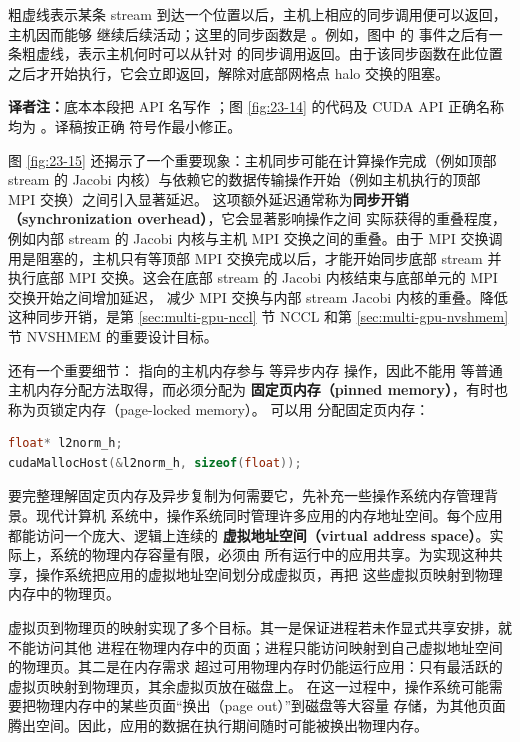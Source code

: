 粗虚线表示某条 stream 到达一个位置以后，主机上相应的同步调用便可以返回，主机因而能够
继续后续活动；这里的同步函数是 。例如，图中
 的
 事件之后有一条粗虚线，表示主机何时可以从针对 
的同步调用返回。由于该同步函数在此位置之后才开始执行，它会立即返回，解除对底部网格点
halo 交换的阻塞。

\noindent\textbf{译者注：}底本本段把 API 名写作 ；图
\ref{fig:23-14} 的代码及 CUDA API 正确名称均为 。译稿按正确
符号作最小修正。

图 \ref{fig:23-15} 还揭示了一个重要现象：主机同步可能在计算操作完成（例如顶部 stream 的
Jacobi 内核）与依赖它的数据传输操作开始（例如主机执行的顶部 MPI 交换）之间引入显著延迟。
这项额外延迟通常称为\textbf{同步开销（synchronization overhead）}，它会显著影响操作之间
实际获得的重叠程度，例如内部 stream 的 Jacobi 内核与主机 MPI 交换之间的重叠。由于 MPI
交换调用是阻塞的，主机只有等顶部 MPI 交换完成以后，才能开始同步底部 stream 并执行底部
MPI 交换。这会在底部 stream 的 Jacobi 内核结束与底部单元的 MPI 交换开始之间增加延迟，
减少 MPI 交换与内部 stream Jacobi 内核的重叠。降低这种同步开销，是第
\ref{sec:multi-gpu-nccl} 节 NCCL 和第 \ref{sec:multi-gpu-nvshmem} 节 NVSHMEM 的重要设计目标。

还有一个重要细节： 指向的主机内存参与  等异步内存
操作，因此不能用  等普通主机内存分配方法取得，而必须分配为
\textbf{固定页内存（pinned memory）}，有时也称为页锁定内存（page-locked memory）。
可以用  分配固定页内存：

\begin{lstlisting}[language=C++,numbers=none]
float* l2norm_h;
cudaMallocHost(&l2norm_h, sizeof(float));
\end{lstlisting}

要完整理解固定页内存及异步复制为何需要它，先补充一些操作系统内存管理背景。现代计算机
系统中，操作系统同时管理许多应用的内存地址空间。每个应用都能访问一个庞大、逻辑上连续的
\textbf{虚拟地址空间（virtual address space）}。实际上，系统的物理内存容量有限，必须由
所有运行中的应用共享。为实现这种共享，操作系统把应用的虚拟地址空间划分成虚拟页，再把
这些虚拟页映射到物理内存中的物理页。

虚拟页到物理页的映射实现了多个目标。其一是保证进程若未作显式共享安排，就不能访问其他
进程在物理内存中的页面；进程只能访问映射到自己虚拟地址空间的物理页。其二是在内存需求
超过可用物理内存时仍能运行应用：只有最活跃的虚拟页映射到物理页，其余虚拟页放在磁盘上。
在这一过程中，操作系统可能需要把物理内存中的某些页面“换出（page out）”到磁盘等大容量
存储，为其他页面腾出空间。因此，应用的数据在执行期间随时可能被换出物理内存。

